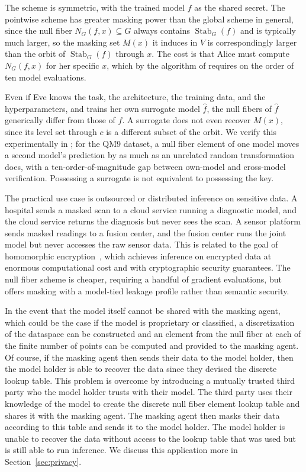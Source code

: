 \documentclass[11pt]{article}
\DeclareMathOperator{\Stab}{Stab}
\begin{document}
The scheme is symmetric, with the trained model $f$ as the shared secret. The pointwise scheme has greater masking power than the global scheme in general, since the null fiber $N_G(f, x) \subseteq G$ always contains $\Stab_G(f)$ and is typically much larger, so the masking set $M(x)$ it induces in $V$ is correspondingly larger than the orbit of $\Stab_G(f)$ through $x$. The cost is that Alice must compute $N_G(f, x)$ for her specific $x$, which by the algorithm of  requires on the order of ten model evaluations.

Even if Eve knows the task, the architecture, the training data, and the hyperparameters, and trains her own surrogate model $\hat{f}$, the null fibers of $\hat{f}$ generically differ from those of $f$. A surrogate does not even recover $M(x)$, since its level set through $c$ is a different subset of the orbit. We verify this experimentally in ; for the QM9 dataset, a null fiber element of one model moves a second model's prediction by as much as an unrelated random transformation does, with a ten-order-of-magnitude gap between own-model and cross-model verification. Possessing a surrogate is not equivalent to possessing the key.

The practical use case is outsourced or distributed inference on sensitive data. A hospital sends a masked scan to a cloud service running a diagnostic model, and the cloud service returns the diagnosis but never sees the scan. A sensor platform sends masked readings to a fusion center, and the fusion center runs the joint model but never accesses the raw sensor data. This is related to the goal of homomorphic encryption~\cite{gentry2009fully,gilad2016cryptonets}, which achieves inference on encrypted data at enormous computational cost and with cryptographic security guarantees. The null fiber scheme is cheaper, requiring a handful of gradient evaluations, but offers masking with a model-tied leakage profile rather than semantic security.

In the event that the model itself cannot be shared with the masking agent, which could be the case if the model is proprietary or classified, a discretization of the dataspace can be constructed and an element from the null fiber at each of the finite number of points can be computed and provided to the masking agent. Of course, if the masking agent then sends their data to the model holder, then the model holder is able to recover the data since they devised the discrete lookup table. This problem is overcome by introducing a mutually trusted third party who the model holder trusts with their model. The third party uses their knowledge of the model to create the discrete null fiber element lookup table and shares it with the masking agent. The masking agent then masks their data according to this table and sends it to the model holder. The model holder is unable to recover the data without access to the lookup table that was used but is still able to run inference. We discuss this application more in Section~\ref{sec:privacy}.
\end{document}
